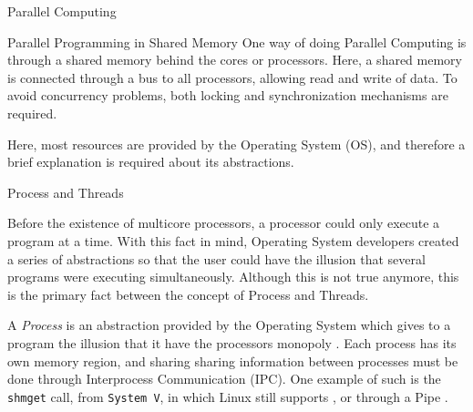 \begin{section}{Parallel Computing}
\begin{subsection}{Parallel Programming in Shared Memory}
	One way of doing Parallel Computing is through a shared memory
	behind the cores or processors. Here, a shared memory is connected
	through a bus to all processors, allowing read and write of data.
	To avoid concurrency problems, both locking and synchronization mechanisms
	are required.


	Here, most resources are provided by the Operating System (OS),
	and therefore a brief explanation is required about its abstractions.


\begin{subsubsection}{Process and Threads}

	Before the existence of multicore processors, a processor
	could only execute a program at a time. With this fact in
	mind, Operating System developers created a series of abstractions
	so that the user could have the illusion that several programs were
	executing simultaneously. Although this is not true anymore, this
	is the primary fact between the concept of Process and Threads.


	A \textit{Process} is an abstraction provided by the Operating System
	which gives to a program the illusion that it have the processors
	monopoly \citep{love:2005}. Each process has its own memory region, and
	sharing sharing information between processes must be done through
	Interprocess Communication (IPC). One example of such is the
	\texttt{shmget} call, from \texttt{System V}, in which Linux still
	supports \citep{shmget}, or through a Pipe \citep{pipe}.


\end{subsubsection}
\end{subsection}
\end{section}
